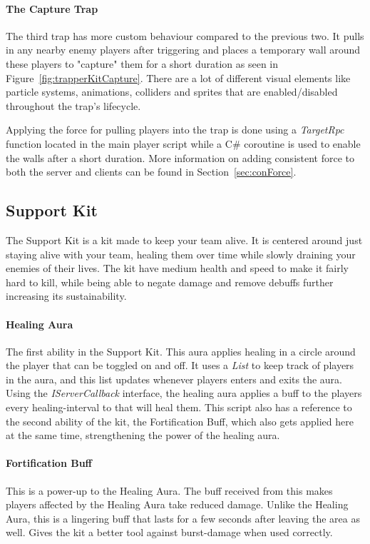 \paragraph{The Capture Trap}
The third trap has more custom behaviour compared to the previous two. It pulls in any nearby enemy players after triggering and places a temporary wall around these players to "capture" them for a short duration as seen in Figure~\ref{fig:trapperKitCapture}. There are a lot of different visual elements like particle systems, animations, colliders and sprites that are enabled/disabled throughout the trap's lifecycle. 

Applying the force for pulling players into the trap is done using a \emph{TargetRpc} function located in the main player script while a C\# coroutine is used to enable the walls after a short duration. More information on adding consistent force to both the server and clients can be found in Section~\ref{sec:conForce}. 

\subsection{Support Kit}
The Support Kit is a kit made to keep your team alive. It is centered around just staying alive with your team, healing them over time while slowly draining your enemies of their lives. The kit have medium health and speed to make it fairly hard to kill, while being able to negate damage and remove debuffs further increasing its sustainability.

\paragraph{Healing Aura}
The first ability in the Support Kit. This aura applies healing in a circle around the player that can be toggled on and off. It uses a \emph{List} to keep track of players in the aura, and this list updates whenever players enters and exits the aura. Using the \emph{IServerCallback} interface, the healing aura applies a buff to the players every healing-interval to that will heal them. This script also has a reference to the second ability of the kit, the Fortification Buff, which also gets applied here at the same time, strengthening the power of the healing aura.

\paragraph{Fortification Buff}
This is a power-up to the Healing Aura. The buff received from this makes players affected by the Healing Aura take reduced damage. Unlike the Healing Aura, this is a lingering buff that lasts for a few seconds after leaving the area as well. Gives the kit a better tool against burst-damage when used correctly.

